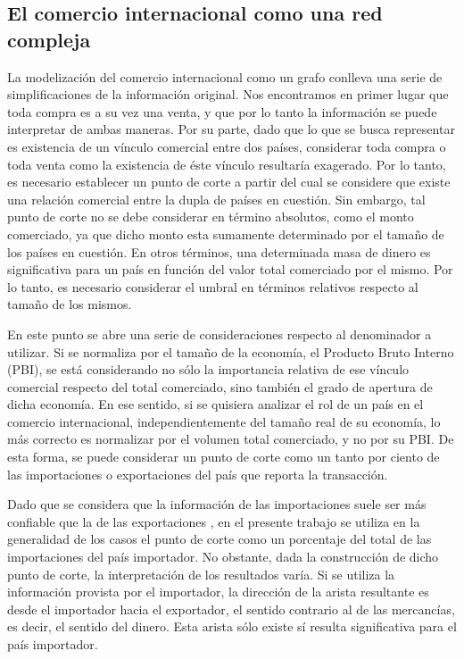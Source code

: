 \documentclass[class=article, crop=false]{standalone}
\begin{document}
\subsection{El comercio internacional como una red compleja}

La modelización del comercio internacional como un grafo conlleva una serie de simplificaciones de la información original. Nos encontramos en primer lugar que toda compra es a su vez una venta, y que por lo tanto la información se puede interpretar de ambas maneras. Por su parte, dado que lo que se busca representar es existencia de un vínculo comercial entre dos países, considerar toda compra o toda venta como la existencia de éste vínculo resultaría exagerado. Por lo tanto, es necesario establecer un punto de corte a partir del cual se considere que existe una relación comercial entre la dupla de países en cuestión. Sin embargo, tal punto de corte no se debe considerar en término absolutos, como el monto comerciado, ya que dicho monto esta sumamente determinado por el tamaño de los países en cuestión. En otros términos, una determinada masa de dinero es significativa para un país en función del valor total comerciado por el mismo. Por lo tanto, es necesario considerar el umbral en términos relativos respecto al tamaño de los mismos.

En este punto se abre una serie de consideraciones respecto al denominador a utilizar. Si se normaliza por el tamaño de la economía, el Producto Bruto Interno (PBI), se está considerando no sólo la importancia relativa de ese vínculo comercial respecto del total comerciado, sino también el grado de apertura de dicha economía. En ese sentido, si se quisiera analizar el rol de un país en el comercio internacional, independientemente del tamaño real de su economía, lo más correcto es normalizar por el volumen total comerciado, y no por su PBI. De esta forma, se puede considerar un punto de corte como un tanto por ciento de las importaciones o exportaciones del país que reporta la transacción.

Dado que se considera que la información de las importaciones suele ser más confiable que la de las exportaciones \citep{Fan2014}, en el presente trabajo se utiliza en la generalidad de los casos el punto de corte como un porcentaje del total de las importaciones del país importador. No obstante, dada la construcción de dicho punto de corte, la interpretación de los resultados varía. Si se utiliza la información provista por el importador, la dirección de la arista resultante es desde el importador hacia el exportador, el sentido contrario al de las mercancías, es decir, el sentido del dinero. Esta arista sólo existe sí resulta significativa para el país importador.     
\end{document}
